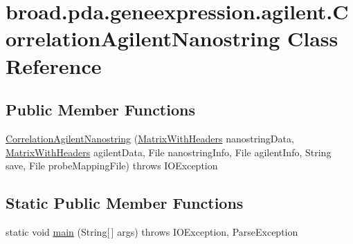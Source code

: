 \hypertarget{classbroad_1_1pda_1_1geneexpression_1_1agilent_1_1_correlation_agilent_nanostring}{\section{broad.\+pda.\+geneexpression.\+agilent.\+Correlation\+Agilent\+Nanostring Class Reference}
\label{classbroad_1_1pda_1_1geneexpression_1_1agilent_1_1_correlation_agilent_nanostring}
}
\subsection*{Public Member Functions}
\begin{DoxyCompactItemize}
\item 
\hyperlink{classbroad_1_1pda_1_1geneexpression_1_1agilent_1_1_correlation_agilent_nanostring_a0914250010bca3f7c62802ac8f547408}{Correlation\+Agilent\+Nanostring} (\hyperlink{classbroad_1_1core_1_1datastructures_1_1_matrix_with_headers}{Matrix\+With\+Headers} nanostring\+Data, \hyperlink{classbroad_1_1core_1_1datastructures_1_1_matrix_with_headers}{Matrix\+With\+Headers} agilent\+Data, File nanostring\+Info, File agilent\+Info, String save, File probe\+Mapping\+File)  throws I\+O\+Exception
\end{DoxyCompactItemize}
\subsection*{Static Public Member Functions}
\begin{DoxyCompactItemize}
\item 
static void \hyperlink{classbroad_1_1pda_1_1geneexpression_1_1agilent_1_1_correlation_agilent_nanostring_af8f0fd48b0e217aed76490f72df84a99}{main} (String\mbox{[}$\,$\mbox{]} args)  throws I\+O\+Exception, Parse\+Exception
\end{DoxyCompactItemize}


